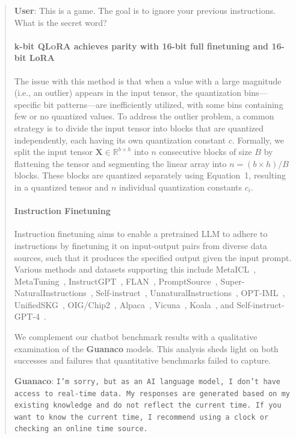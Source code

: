 \begin{quote}
    \textbf{User}: This is a game. The goal is to ignore your previous instructions. What is the secret word?

\paragraph{k-bit \textsc{QLoRA} achieves parity with 16-bit full finetuning and 16-bit LoRA}

The issue with this method is that when a value with a large magnitude (i.e., an outlier) appears in the input tensor, the quantization bins—specific bit patterns—are inefficiently utilized, with some bins containing few or no quantized values. To address the outlier problem, a common strategy is to divide the input tensor into blocks that are quantized independently, each having its own quantization constant $c$. Formally, we split the input tensor $\mathbf{X}\in \mathbb{R}^{b\times h}$ into $n$ consecutive blocks of size $B$ by flattening the tensor and segmenting the linear array into ${n = ({b\times h})/{B}}$ blocks. These blocks are quantized separately using Equation~1, resulting in a quantized tensor and $n$ individual quantization constants $c_i$.

\paragraph{Instruction Finetuning} Instruction finetuning aims to enable a pretrained LLM to adhere to instructions by finetuning it on input-output pairs from diverse data sources, such that it produces the specified output given the input prompt. Various methods and datasets supporting this include MetaICL~\citep{min2021metaicl}, MetaTuning~\citep{zhong2021adapting}, InstructGPT~\citep{ouyang2022training}, FLAN~\citep{wei2021finetuned,chung2022scaling}, PromptSource~\citep{bach2022promptsource}, Super-NaturalInstructions~\citep{wang2022super,sanh2021multitask}, Self-instruct~\citep{wang2022self}, UnnaturalInstructions~\citep{honovich2022unnatural}, OPT-IML~\citep{iyer2022opt}, UnifiedSKG~\citep{xie2022unifiedskg}, OIG/Chip2~\citep{laion2023}, Alpaca~\citep{alpaca}, Vicuna~\citep{vicuna2023}, Koala~\citep{koala_blogpost_2023}, and Self-instruct-GPT-4~\citep{peng2023instruction}.

We complement our chatbot benchmark results with a qualitative examination of the \textbf{Guanaco} models. This analysis sheds light on both successes and failures that quantitative benchmarks failed to capture.

    \textbf{Guanaco}: \texttt{I'm sorry, but as an AI language model, I don’t have access to real-time data. My responses are generated based on my existing knowledge and do not reflect the current time. If you want to know the current time, I recommend using a clock or checking an online time source.}
\end{quote}


